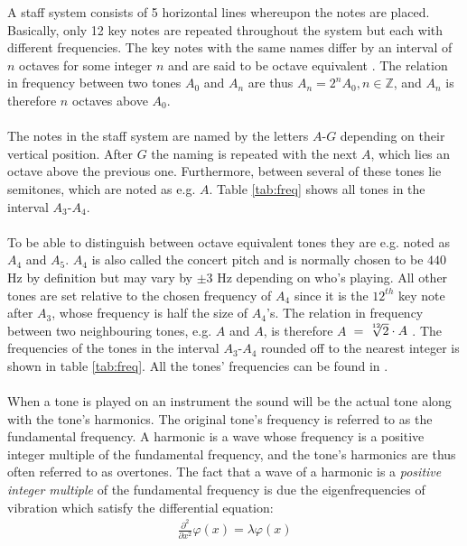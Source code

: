 \noindent
A staff system consists of 5 horizontal lines whereupon the notes are placed. Basically, only 12 key notes are repeated throughout the system but each with different frequencies. The key notes with the same names differ by an interval of $n$ octaves for some integer $n$ and are said to be octave equivalent \cite{MusicTheory}. The relation in frequency between two tones $A_0$ and $A_n$ are thus $A_n = 2^n A_0, n \in \mathbb{Z}$, and $A_n$ is therefore $n$ octaves above $A_0$.
\\ \\
The notes in the staff system are named by the letters $A$-$G$ depending on their vertical position. After $G$ the naming is repeated with the next $A$, which lies an octave above the previous one. Furthermore, between several of these tones lie semitones, which are noted as e.g. $A$\hashsharp{}. Table \ref{tab:freq} shows all tones in the interval $A_3$-$A_4$.
\\ \\
To be able to distinguish between octave equivalent tones they are e.g. noted as $A_4$ and $A_5$. $A_4$ is also called the concert pitch and is normally chosen to be $440$ Hz by definition but may vary by $\pm 3$ Hz depending on who's playing. All other tones are set relative to the chosen frequency of $A_4$ since it is the $12^{th}$ key note after $A_3$, whose frequency is half the size of $A_4$'s. The relation in frequency between two neighbouring tones, e.g. $A$ and $A$\hashsharp, is therefore $A$\hashsharp \ $= \sqrt[\leftroot{-2}\uproot{2}12]{2} \cdot A$ \cite{MusicTheory}. The frequencies of the tones in the interval $A_3$-$A_4$ rounded off to the nearest integer is shown in table \ref{tab:freq}. All the tones' frequencies can be found in \cite{FreqsString}.
\\ \\
When a tone is played on an instrument the sound will be the actual tone along with the tone's harmonics. The original tone's frequency is referred to as the fundamental frequency. A harmonic is a wave whose frequency is a positive integer multiple of the fundamental frequency, and the tone's harmonics are thus often referred to as overtones. The fact that a wave of a harmonic is a \textit{positive integer multiple} of the fundamental frequency is due the eigenfrequencies of vibration which satisfy the differential equation:
\begin{align*}
\frac{\partial^2}{\partial x^2} \varphi(x) = \lambda \varphi(x)
\end{align*}

